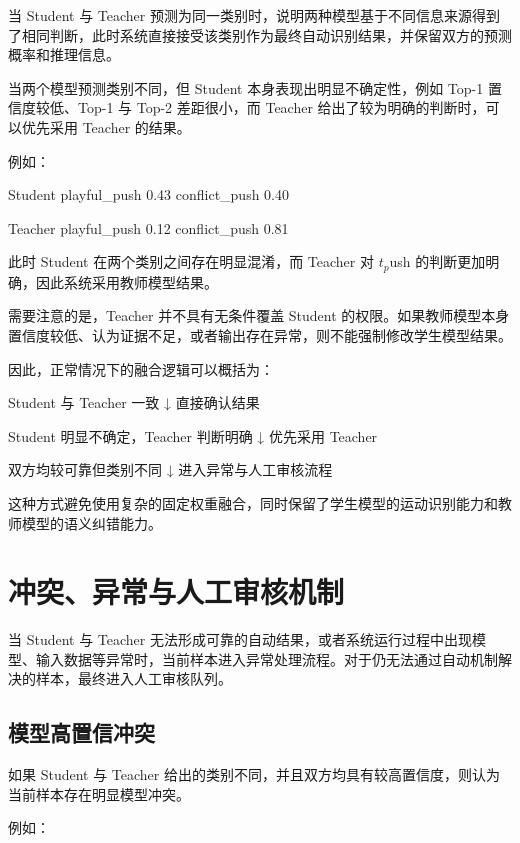当 Student 与 Teacher 预测为同一类别时，说明两种模型基于不同信息来源得到了相同判断，此时系统直接接受该类别作为最终自动识别结果，并保留双方的预测概率和推理信息。

当两个模型预测类别不同，但 Student 本身表现出明显不确定性，例如 Top-1 置信度较低、Top-1 与 Top-2 差距很小，而 Teacher 给出了较为明确的判断时，可以优先采用 Teacher 的结果。

例如：

\begin{NotionCode}
Student
playful_push     0.43
conflict_push    0.40

Teacher
playful_push     0.12
conflict_push    0.81
\end{NotionCode}

此时 Student 在两个类别之间存在明显混淆，而 Teacher 对 \(t_p\)ush 的判断更加明确，因此系统采用教师模型结果。

需要注意的是，Teacher 并不具有无条件覆盖 Student 的权限。如果教师模型本身置信度较低、认为证据不足，或者输出存在异常，则不能强制修改学生模型结果。

因此，正常情况下的融合逻辑可以概括为：

\begin{NotionCode}
Student 与 Teacher 一致
        ↓
直接确认结果

Student 明显不确定，Teacher 判断明确
        ↓
优先采用 Teacher

双方均较可靠但类别不同
        ↓
进入异常与人工审核流程
\end{NotionCode}

这种方式避免使用复杂的固定权重融合，同时保留了学生模型的运动识别能力和教师模型的语义纠错能力。


\section{冲突、异常与人工审核机制}

当 Student 与 Teacher 无法形成可靠的自动结果，或者系统运行过程中出现模型、输入数据等异常时，当前样本进入异常处理流程。对于仍无法通过自动机制解决的样本，最终进入人工审核队列。

\subsection{模型高置信冲突}

如果 Student 与 Teacher 给出的类别不同，并且双方均具有较高置信度，则认为当前样本存在明显模型冲突。

例如：

